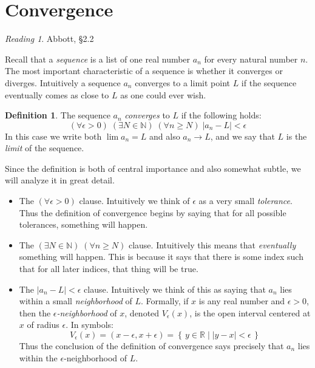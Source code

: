 \documentclass[11pt,oneside]{amsbook}
\newcommand{\set}[1]{\left\{\,#1\,\right\}}
\newcommand{\NN}{\mathbb N}
\newcommand{\RR}{\mathbb R}
\theoremstyle{definition}
\theoremstyle{plain}
\theoremstyle{definition}
\newtheorem{defn}[thm]{Definition}
\theoremstyle{remark}
\newtheorem*{reading}{Reading}
\numberwithin{equation}{section}
\numberwithin{figure}{section}
\begin{document}
\newpage
\section{Convergence}

\begin{reading}
  Abbott, \S 2.2
\end{reading}

Recall that a \emph{sequence} is a list of one real number $a_n$ for every natural number $n$. The most important characteristic of a sequence is whether it converges or diverges. Intuitively a sequence $a_n$ converges to a limit point $L$ if the sequence eventually comes as close to $L$ as one could ever wish.

\begin{defn}
  The sequence $a_n$ \emph{converges} to $L$ if the following holds:
  \[(\forall\epsilon>0)\;(\exists N\in\NN)\;(\forall n\geq N)\;|a_n-L|<\epsilon
  \]
  In this case we write both $\lim a_n=L$ and also $a_n\to L$, and we say that $L$ is the \emph{limit} of the sequence.
\end{defn}

Since the definition is both of central importance and also somewhat subtle, we will analyze it in great detail.

\begin{itemize}
\item The $(\forall\epsilon>0)$ clause. Intuitively we think of $\epsilon$ as a very small \emph{tolerance}. Thus the definition of convergence begins by saying that for all possible tolerances, something will happen.
\item The $(\exists N\in\NN)\;(\forall n\geq N)$ clause. Intuitively this means that \emph{eventually} something will happen. This is because it says that there is some index such that for all later indices, that thing will be true.
\item The $|a_n-L|<\epsilon$ clause. Intuitively we think of this as saying that $a_n$ lies within a small \emph{neighborhood} of $L$. Formally, if $x$ is any real number and $\epsilon>0$, then the \emph{$\epsilon$-neighborhood} of $x$, denoted $V_\epsilon(x)$, is the open interval centered at $x$ of radius $\epsilon$. In symbols:
  \[V_\epsilon(x)=(x-\epsilon,x+\epsilon)=\set{y\in\RR\mid|y-x|<\epsilon}
  \]
  Thus the conclusion of the definition of convergence says precisely that $a_n$ lies within the $\epsilon$-neighborhood of $L$.
\end{itemize}
\end{document}
